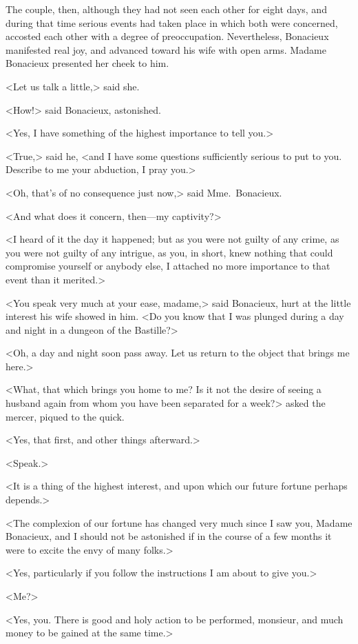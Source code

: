 The couple, then, although they had not seen each other for eight days, and during that time serious events had taken place in which both were concerned, accosted each other with a degree of preoccupation. Nevertheless, Bonacieux manifested real joy, and advanced toward his wife with open arms. Madame Bonacieux presented her cheek to him. 

<Let us talk a little,> said she. 

<How!> said Bonacieux, astonished. 

<Yes, I have something of the highest importance to tell you.> 

<True,> said he, <and I have some questions sufficiently serious to put to you. Describe to me your abduction, I pray you.> 

<Oh, that's of no consequence just now,> said Mme.~Bonacieux. 

<And what does it concern, then—my captivity?> 

<I heard of it the day it happened; but as you were not guilty of any crime, as you were not guilty of any intrigue, as you, in short, knew nothing that could compromise yourself or anybody else, I attached no more importance to that event than it merited.> 

<You speak very much at your ease, madame,> said Bonacieux, hurt at the little interest his wife showed in him. <Do you know that I was plunged during a day and night in a dungeon of the Bastille?> 

<Oh, a day and night soon pass away. Let us return to the object that brings me here.> 

<What, that which brings you home to me? Is it not the desire of seeing a husband again from whom you have been separated for a week?> asked the mercer, piqued to the quick. 

<Yes, that first, and other things afterward.> 

<Speak.> 

<It is a thing of the highest interest, and upon which our future fortune perhaps depends.> 

<The complexion of our fortune has changed very much since I saw you, Madame Bonacieux, and I should not be astonished if in the course of a few months it were to excite the envy of many folks.> 

<Yes, particularly if you follow the instructions I am about to give you.> 

<Me?> 

<Yes, you. There is good and holy action to be performed, monsieur, and much money to be gained at the same time.> 

